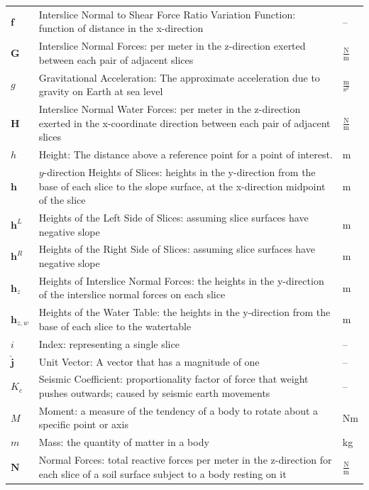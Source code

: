 \documentclass[12pt]{article}
\begin{document}
\begin{longtabu}{l X[l] l}
\\
$\mathbf{f}$ & Interslice Normal to Shear Force Ratio Variation Function: function of distance in the x-direction & --
\\
$\mathbf{G}$ & Interslice Normal Forces: per meter in the z-direction exerted between each pair of adjacent slices & $\frac{\text{N}}{\text{m}}$
\\
$g$ & Gravitational Acceleration: The approximate acceleration due to gravity on Earth at sea level & $\frac{\text{m}}{\text{s}^{2}}$
\\
$\mathbf{H}$ & Interslice Normal Water Forces: per meter in the z-direction exerted in the x-coordinate direction between each pair of adjacent slices & $\frac{\text{N}}{\text{m}}$
\\
$h$ & Height: The distance above a reference point for a point of interest. & m
\\
$\mathbf{h}$ & $y$-direction Heights of Slices: heights in the y-direction from the base of each slice to the slope surface, at the x-direction midpoint of the slice & m
\\
${\mathbf{h}^{L}}$ & Heights of the Left Side of Slices: assuming slice surfaces have negative slope & m
\\
${\mathbf{h}^{R}}$ & Heights of the Right Side of Slices: assuming slice surfaces have negative slope & m
\\
${\mathbf{h}_{z}}$ & Heights of Interslice Normal Forces: the heights in the y-direction of the interslice normal forces on each slice & m
\\
${\mathbf{h}_{z,w}}$ & Heights of the Water Table: the heights in the y-direction from the base of each slice to the watertable & m
\\
$i$ & Index: representing a single slice & --
\\
$\mathbf{\hat{j}}$ & Unit Vector: A vector that has a magnitude of one & --
\\
${K_{c}}$ & Seismic Coefficient: proportionality factor of force that weight pushes outwards; caused by seismic earth movements & --
\\
$M$ & Moment: a measure of the tendency of a body to rotate about a specific point or axis & Nm
\\
$m$ & Mass: the quantity of matter in a body & kg
\\
$\mathbf{N}$ & Normal Forces: total reactive forces per meter in the z-direction for each slice of a soil surface subject to a body resting on it & $\frac{\text{N}}{\text{m}}$
\\

\end{longtabu}
\end{document}
